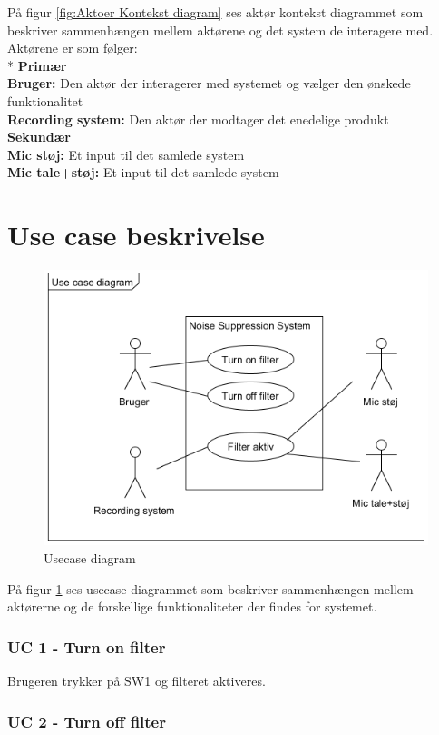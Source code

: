 På figur \ref{fig:Aktoer Kontekst diagram} ses aktør kontekst diagrammet som beskriver sammenhængen mellem aktørene og det system de interagere med. Aktørene er som følger: \\*
\textbf{Primær}\\
\textbf{Bruger:} Den aktør der interagerer med systemet og vælger den ønskede funktionalitet \\
\textbf{Recording system:} Den aktør der modtager det enedelige produkt\\
\textbf{Sekundær}\\
\textbf{Mic støj:} Et input til det samlede system\\
\textbf{Mic tale+støj:} Et input til det samlede system \\

\section{Use case beskrivelse}

\begin{figure}[H]
	\centering
	\includegraphics[width = 300 pt]{Img/Usecase_Diagram.png}
	\caption{Usecase diagram}
	\label{fig:Usecase diagram}
\end{figure}

På figur \ref{fig:Usecase diagram} ses usecase diagrammet som beskriver sammenhængen mellem aktørerne og de forskellige funktionaliteter der findes for systemet.

\subsubsection{UC 1 - Turn on filter}

Brugeren trykker på SW1 og filteret aktiveres. 


\subsubsection{UC 2 - Turn off filter}


